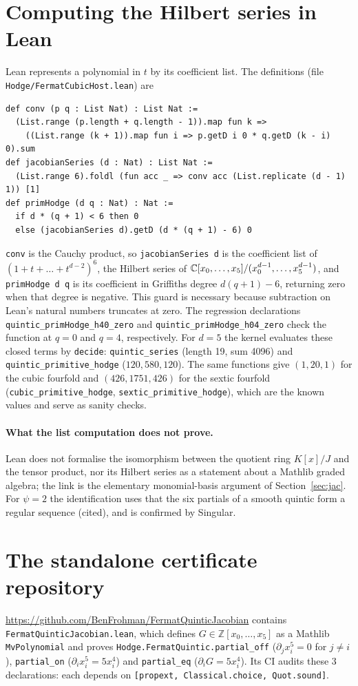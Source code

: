 \documentclass[11pt]{article}
\theoremstyle{definition}\newtheorem{definition}[theorem]{Definition}\newtheorem{remark}[theorem]{Remark}
\begin{document}
\section{Computing the Hilbert series in Lean}\label{sec:conv}
Lean represents a polynomial in $t$ by its coefficient list. The definitions (file \texttt{Hodge/FermatCubicHost.lean}) are
\begin{verbatim}
def conv (p q : List Nat) : List Nat :=
  (List.range (p.length + q.length - 1)).map fun k =>
    ((List.range (k + 1)).map fun i => p.getD i 0 * q.getD (k - i) 0).sum
def jacobianSeries (d : Nat) : List Nat :=
  (List.range 6).foldl (fun acc _ => conv acc (List.replicate (d - 1) 1)) [1]
def primHodge (d q : Nat) : Nat :=
  if d * (q + 1) < 6 then 0
  else (jacobianSeries d).getD (d * (q + 1) - 6) 0
\end{verbatim}
\texttt{conv} is the Cauchy product, so \texttt{jacobianSeries d} is the coefficient list of
$(1+t+\dots+t^{d-2})^6$, the Hilbert series of $\mathbb{C}[x_0,\dots,x_5]/(x_0^{d-1},\dots,x_5^{d-1})$, and
\texttt{primHodge d q} is its coefficient in Griffiths degree $d(q+1)-6$, returning zero when that degree
is negative. This guard is necessary because subtraction on Lean's natural numbers truncates
at zero. The regression declarations \texttt{quintic\_primHodge\_h40\_zero} and
\texttt{quintic\_primHodge\_h04\_zero} check the function at $q=0$ and $q=4$, respectively. For $d=5$ the kernel evaluates
these closed terms by \texttt{decide}: \texttt{quintic\_series} (length 19, sum 4096) and
\texttt{quintic\_primitive\_hodge} ($120,580,120$). The same functions give $(1,20,1)$ for the cubic fourfold and
$(426,1751,426)$ for the sextic fourfold (\texttt{cubic\_primitive\_hodge}, \texttt{sextic\_primitive\_hodge}),
which are the known values and serve as sanity checks.

\paragraph{What the list computation does not prove.} Lean does not formalise the isomorphism between the
quotient ring $K[x]/J$ and the tensor product, nor its Hilbert series as a statement about a Mathlib
graded algebra; the link is the elementary monomial-basis argument of Section~\ref{sec:jac}. For $\psi=2$ the
identification uses that the six partials of a smooth quintic form a regular sequence (cited), and is
confirmed by Singular.

\section{The standalone certificate repository}
\url{https://github.com/BenFrohman/FermatQuinticJacobian} contains \texttt{FermatQuinticJacobian.lean},
which defines $G\in\mathbb Z[x_0,\dots,x_5]$ as a Mathlib \texttt{MvPolynomial} and proves
\texttt{Hodge.FermatQuintic.partial\_off} ($\partial_jx_i^5=0$ for $j\neq i$),
\texttt{partial\_on} ($\partial_ix_i^5=5x_i^4$) and \texttt{partial\_eq} ($\partial_iG=5x_i^4$).
Its CI audits these 3 declarations: each depends on \texttt{[propext, Classical.choice, Quot.sound]}.
\end{document}
